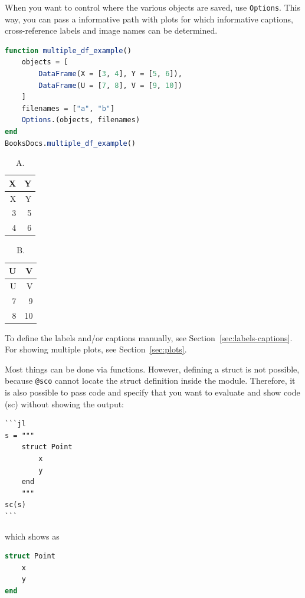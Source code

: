 \documentclass[
  notoc %
]{tufte-book}
\newcommand{\passthrough}[1]{#1}
\begin{document}
When you want to control where the various objects are saved, use
\passthrough{\lstinline!Options!}. This way, you can pass a informative
path with plots for which informative captions, cross-reference labels
and image names can be determined.

\begin{lstlisting}[language=Julia]
function multiple_df_example()
    objects = [
        DataFrame(X = [3, 4], Y = [5, 6]),
        DataFrame(U = [7, 8], V = [9, 10])
    ]
    filenames = ["a", "b"]
    Options.(objects, filenames)
end
BooksDocs.multiple_df_example()
\end{lstlisting}

\hypertarget{tbl:a}{}
\begin{longtable}[]{@{}rr@{}}
\caption{\label{tbl:a}A.}\tabularnewline
\toprule
X & Y \\
\midrule
\endfirsthead
\toprule
X & Y \\
\midrule
\endhead
3 & 5 \\
4 & 6 \\
\bottomrule
\end{longtable}

\hypertarget{tbl:b}{}
\begin{longtable}[]{@{}rr@{}}
\caption{\label{tbl:b}B.}\tabularnewline
\toprule
U & V \\
\midrule
\endfirsthead
\toprule
U & V \\
\midrule
\endhead
7 & 9 \\
8 & 10 \\
\bottomrule
\end{longtable}

To define the labels and/or captions manually, see
Section~\ref{sec:labels-captions}. For showing multiple plots, see
Section~\ref{sec:plots}.

Most things can be done via functions. However, defining a struct is not
possible, because \passthrough{\lstinline!@sco!} cannot locate the
struct definition inside the module. Therefore, it is also possible to
pass code and specify that you want to evaluate and show code (sc)
without showing the output:

\begin{lstlisting}
```jl
s = """
    struct Point
        x
        y
    end
    """
sc(s)
```
\end{lstlisting}

which shows as

\begin{lstlisting}[language=Julia]
struct Point
    x
    y
end
\end{lstlisting}
\end{document}
